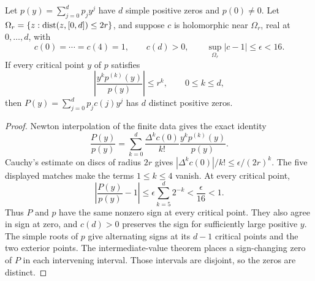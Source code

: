 \documentclass[12pt]{article}
\begin{document}
\begin{lemma}\label{lem:stability}
Let $p(y)=\sum_{j=0}^{d}p_jy^j$ have $d$ simple positive zeros and
$p(0)\ne0$.  Let
$\Omega_r=\{z:\operatorname{dist}(z,[0,d])\le2r\}$, and suppose $c$ is holomorphic near
$\Omega_r$, real at $0,\ldots,d$, with
\[
 c(0)=\cdots=c(4)=1,\qquad c(d)>0,\qquad
 \sup_{\Omega_r}|c-1|\le\epsilon<16.
\]
If every critical point $y$ of $p$ satisfies
\begin{equation}\label{eq:stability-radius}
 \left|\frac{y^kp^{(k)}(y)}{p(y)}\right|\le r^k,
 \qquad0\le k\le d,
\end{equation}
then $P(y)=\sum_{j=0}^{d}p_jc(j)y^j$ has $d$ distinct positive zeros.
\end{lemma}

\begin{proof}
Newton interpolation of the finite data gives the exact identity
\begin{equation}\label{eq:newton-multiplier}
 \frac{P(y)}{p(y)}
 =\sum_{k=0}^{d}\frac{\Delta^kc(0)}{k!}
 \frac{y^kp^{(k)}(y)}{p(y)}.
\end{equation}
Cauchy's estimate on discs of radius $2r$ gives
$|\Delta^kc(0)|/k!\le\epsilon/(2r)^k$.  The five displayed matches make the
terms $1\le k\le4$ vanish.  At every critical point,
\begin{equation}\label{eq:geometric-tail}
 \left|\frac{P(y)}{p(y)}-1\right|
 \le\epsilon\sum_{k=5}^{d}2^{-k}
 <\frac\epsilon{16}<1.
\end{equation}
Thus $P$ and $p$ have the same nonzero sign at every critical point.  They
also agree in sign at zero, and $c(d)>0$ preserves the sign for sufficiently
large positive $y$.  The simple roots of $p$ give alternating signs at its
$d-1$ critical points and the two exterior points.  The intermediate-value
theorem places a sign-changing zero of $P$ in each intervening interval.
Those intervals are disjoint, so the zeros are distinct.
\end{proof}
\end{document}
